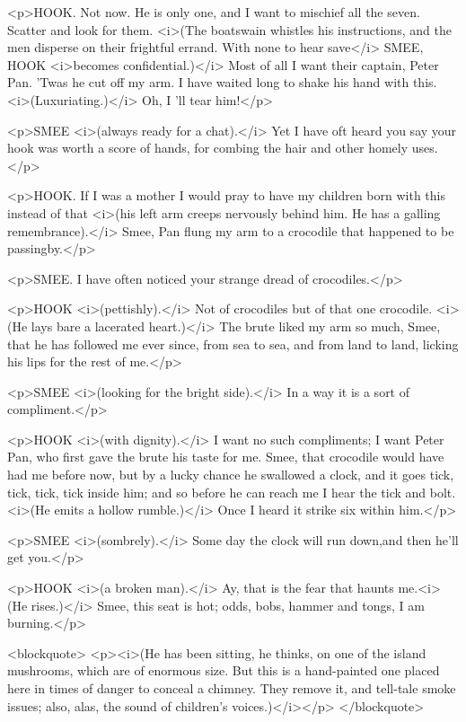 <p>HOOK. Not now. He is only one, and I want to mischief all the seven. Scatter and look for them. <i>(The boatswain whistles his instructions, and the men disperse on their frightful errand. With none to hear save</i> SMEE, HOOK <i>becomes confidential.)</i> Most of all I want their captain, Peter Pan. 'Twas he cut off my arm. I have waited long to shake his hand with this. <i>(Luxuriating.)</i> Oh, I 'll tear him!</p>

<p>SMEE <i>(always ready for a chat).</i> Yet I have oft heard you say your hook was worth a score of hands, for combing the hair and other homely uses.</p>

<p>HOOK. If I was a mother I would pray to have my children born with this instead of that <i>(his left arm creeps nervously behind him. He has a galling remembrance).</i> Smee, Pan flung my arm to a crocodile that happened to be passingby.</p>

<p>SMEE. I have often noticed your strange dread of crocodiles.</p>

<p>HOOK <i>(pettishly).</i> Not of crocodiles but of that one crocodile. <i>(He lays bare a lacerated heart.)</i> The brute liked my arm so much, Smee, that he has followed me ever since, from sea to sea, and from land to land, licking his lips for the rest of me.</p>

<p>SMEE <i>(looking for the bright side).</i> In a way it is a sort of compliment.</p>

<p>HOOK <i>(with dignity).</i> I want no such compliments; I want Peter Pan, who first gave the brute his taste for me. Smee, that crocodile would have had me before now, but by a lucky chance he swallowed a clock, and it goes tick, tick, tick, tick inside him; and so before he can reach me I hear the tick and bolt. <i>(He emits a hollow rumble.)</i> Once I heard it strike six within him.</p>

<p>SMEE <i>(sombrely).</i> Some day the clock will run down,and then he'll get you.</p>

<p>HOOK <i>(a broken man).</i> Ay, that is the fear that haunts me.<i>(He rises.)</i> Smee, this seat is hot; odds, bobs, hammer and tongs, I am burning.</p>

<blockquote> <p><i>(He has been sitting, he thinks, on one of the island mushrooms, which are of enormous size. But this is a hand-painted one placed here in times of danger to conceal a chimney. They remove it, and tell-tale smoke issues; also, alas, the sound of children's voices.)</i></p> </blockquote>

